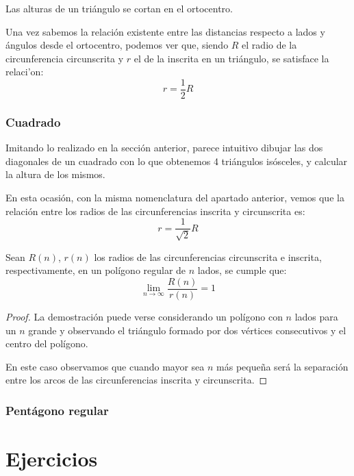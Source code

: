 \documentclass{apuntes}
\begin{document}
\begin{theorem}
Las alturas de un triángulo se cortan en el ortocentro.
\end{theorem}

Una vez sabemos la relación existente entre las distancias respecto a lados y ángulos desde el ortocentro, podemos ver que, siendo $R$ el radio de la circunferencia circunscrita y $r$ el de la inscrita en un triángulo, se satisface la relaci'on:
\[r = \frac{1}{2} R\]

\subsection{Cuadrado}
Imitando lo realizado en la sección anterior, parece intuitivo dibujar las dos diagonales de un cuadrado con lo que obtenemos 4 triángulos isósceles, y calcular la altura de los mismos.

\begin{center}
\end{center}

En esta ocasión, con la misma nomenclatura del apartado anterior, vemos que la relación entre los radios de las circunferencias inscrita y circunscrita es:
\[r = \frac{1}{\sqrt{2}}R\]

\begin{theorem}
Sean $R(n)$, $r(n)$ los radios de las circunferencias circunscrita e inscrita, respectivamente, en un polígono regular de $n$ lados, se cumple que:
\[\lim_{n\to \infty} \frac{R(n)}{r(n)}=1\]
\end{theorem}
\begin{proof}
La demostración puede verse considerando un polígono con $n$ lados para un $n$ grande y observando el triángulo formado por dos vértices consecutivos y el centro del polígono.

En este caso observamos que cuando mayor sea $n$ más pequeña será la separación entre los arcos de las circunferencias inscrita y circunscrita.
\end{proof}

\subsection{Pentágono regular}


\appendix
\chapter{Ejercicios}

\printindex
\end{document}

